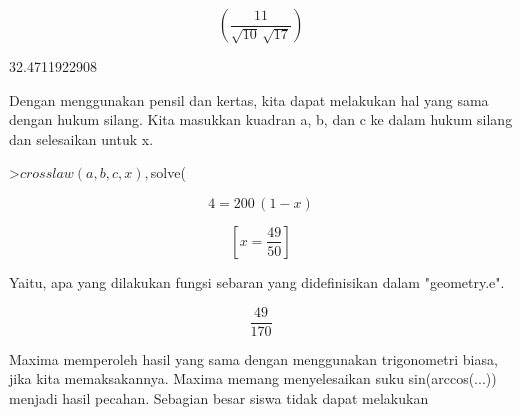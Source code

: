 \documentclass[a4paper,10pt]{article}
\begin{document}
\begin{eulernotebook}
\begin{eulercomment}
\begin{eulercomment}
\begin{eulercomment}
\begin{eulercomment}
\begin{eulercomment}
\begin{eulercomment}
\begin{eulercomment}
\begin{eulercomment}
\begin{eulercomment}
\begin{eulercomment}
\begin{eulercomment}
\begin{eulercomment}
\begin{eulercomment}
\begin{eulercomment}
\begin{eulercomment}
\begin{eulercomment}
\begin{eulercomment}
\begin{eulercomment}
\begin{eulercomment}
\begin{eulercomment}
\begin{eulercomment}
\begin{eulercomment}
\begin{eulercomment}
\begin{eulercomment}
\begin{eulercomment}
\begin{eulercomment}
\begin{eulercomment}
\begin{eulercomment}
\begin{eulercomment}
\begin{eulercomment}
\begin{eulercomment}
\begin{eulercomment}
\begin{eulercomment}
\begin{eulercomment}
\begin{eulercomment}
\begin{eulercomment}
\begin{eulercomment}
\begin{eulercomment}
\begin{eulercomment}
\begin{eulercomment}
\begin{eulercomment}
\begin{eulercomment}
\begin{eulercomment}
\begin{eulercomment}
\begin{eulercomment}
\begin{eulercomment}
\begin{eulercomment}
\begin{eulercomment}
\begin{eulercomment}
\begin{eulercomment}
\begin{eulercomment}
\begin{eulercomment}
\begin{eulercomment}
\begin{eulercomment}
\begin{eulercomment}
\begin{eulercomment}
\begin{eulercomment}
\begin{eulercomment}
\begin{eulercomment}
\begin{eulercomment}
\begin{eulercomment}
\begin{eulercomment}
\begin{eulerformula}
\[\left(\frac{11}{\sqrt{10}\,\sqrt{17}}\right)
\]
\end{eulerformula}
\begin{euleroutput}
  32.4711922908
\end{euleroutput}
\begin{eulercomment}
Dengan menggunakan pensil dan kertas, kita dapat melakukan hal yang
sama dengan hukum silang. Kita masukkan kuadran a, b, dan c ke dalam
hukum silang dan selesaikan untuk x.
\end{eulercomment}
\begin{eulerprompt}
>$crosslaw(a,b,c,x), $solve(%
\end{eulerprompt}
\begin{eulerformula}
\[
4=200\,\left(1-x\right)
\]
\end{eulerformula}
\begin{eulerformula}
\[
\left[ x=\frac{49}{50} \right] 
\]
\end{eulerformula}
\begin{eulercomment}
Yaitu, apa yang dilakukan fungsi sebaran yang didefinisikan dalam
"geometry.e".
\end{eulercomment}
\begin{eulerformula}
\[
\frac{49}{170}
\]
\end{eulerformula}
\begin{eulercomment}
Maxima memperoleh hasil yang sama dengan menggunakan trigonometri
biasa, jika kita memaksakannya. Maxima memang menyelesaikan suku
sin(arccos(...)) menjadi hasil pecahan. Sebagian besar siswa tidak
dapat melakukan 
\end{eulercomment}
\end{eulercomment}
\end{eulercomment}
\end{eulercomment}
\end{eulercomment}
\end{eulercomment}
\end{eulercomment}
\end{eulercomment}
\end{eulercomment}
\end{eulercomment}
\end{eulercomment}
\end{eulercomment}
\end{eulercomment}
\end{eulercomment}
\end{eulercomment}
\end{eulercomment}
\end{eulercomment}
\end{eulercomment}
\end{eulercomment}
\end{eulercomment}
\end{eulercomment}
\end{eulercomment}
\end{eulercomment}
\end{eulercomment}
\end{eulercomment}
\end{eulercomment}
\end{eulercomment}
\end{eulercomment}
\end{eulercomment}
\end{eulercomment}
\end{eulercomment}
\end{eulercomment}
\end{eulercomment}
\end{eulercomment}
\end{eulercomment}
\end{eulercomment}
\end{eulercomment}
\end{eulercomment}
\end{eulercomment}
\end{eulercomment}
\end{eulercomment}
\end{eulercomment}
\end{eulercomment}
\end{eulercomment}
\end{eulercomment}
\end{eulercomment}
\end{eulercomment}
\end{eulercomment}
\end{eulercomment}
\end{eulercomment}
\end{eulercomment}
\end{eulercomment}
\end{eulercomment}
\end{eulercomment}
\end{eulercomment}
\end{eulercomment}
\end{eulercomment}
\end{eulercomment}
\end{eulercomment}
\end{eulercomment}
\end{eulercomment}
\end{eulercomment}
\end{eulercomment}
\end{eulernotebook}
\end{document}
